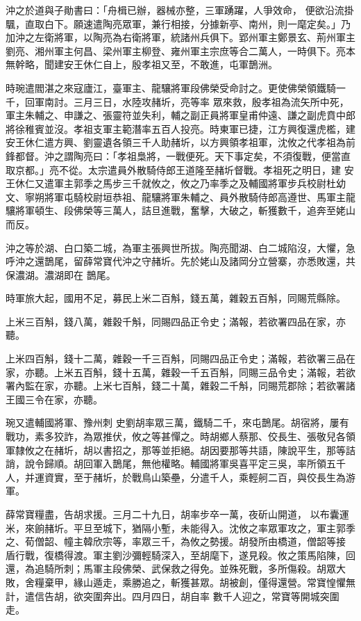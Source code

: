 \begin{pinyinscope}
 沖之於道與子勛書曰：「舟楫已辦，器械亦整，三軍踴躍，人爭效命，
 便欲沿流掛颿，直取白下。願速遣陶亮眾軍，兼行相接，分據新亭、南州，則一麾定矣。」乃加沖之左衛將軍，以陶亮為右衛將軍，統諸州兵俱下。郢州軍主鄭景玄、荊州軍主劉亮、湘州軍主何昌、梁州軍主柳登、雍州軍主宗庶等合二萬人，一時俱下。亮本無幹略，聞建安王休仁自上，殷孝祖又至，不敢進，屯軍鵲洲。



 時琬遣閻湛之來寇廬江，臺軍主、龍驤將軍段佛榮受命討之。更使佛榮領鐵騎一千，回軍南討。三月三日，水陸攻赭圻，亮等率
 眾來救，殷孝祖為流矢所中死，軍主朱輔之、申謙之、張靈符並失利，輔之副正員將軍皇甫仲遠、謙之副虎賁中郎將徐稚賓並沒。孝祖支軍主範潛率五百人投亮。時東軍已捷，江方興復還虎檻，建安王休仁遣方興、劉靈遺各領三千人助赭圻，以方興領孝祖軍，沈攸之代孝祖為前鋒都督。沖之謂陶亮曰：「孝祖梟將，一戰便死。天下事定矣，不須復戰，便當直取京都。」亮不從。太宗遣員外散騎侍郎王道隆至赭圻督戰。孝祖死之明日，建
 安王休仁又遣軍主郭季之馬步三千就攸之，攸之乃率季之及輔國將軍步兵校尉杜幼文、寧朔將軍屯騎校尉垣恭祖、龍驤將軍朱輔之、員外散騎侍郎高遵世、馬軍主龍驤將軍頓生、段佛榮等三萬人，詰旦進戰，奮擊，大破之，斬獲數千，追奔至姥山而反。



 沖之等於湖、白口築二城，為軍主張興世所拔。陶亮聞湖、白二城陷沒，大懼，急呼沖之還鵲尾，留薛常寶代沖之守赭圻。先於姥山及諸岡分立營寨，亦悉敗還，共保濃湖。濃湖即在
 鵲尾。



 時軍旅大起，國用不足，募民上米二百斛，錢五萬，雜穀五百斛，同賜荒縣除。



 上米三百斛，錢八萬，雜穀千斛，同賜四品正令史；滿報，若欲署四品在家，亦聽。



 上米四百斛，錢十二萬，雜穀一千三百斛，同賜四品正令史；滿報，若欲署三品在家，亦聽。上米五百斛，錢十五萬，雜穀一千五百斛，同賜三品令史；滿報，若欲署內監在家，亦聽。上米七百斛，錢二十萬，雜穀二千斛，同賜荒郡除；若欲署諸王國三令在家，亦聽。



 琬又遣輔國將軍、豫州刺
 史劉胡率眾三萬，鐵騎二千，來屯鵲尾。胡宿將，屢有戰功，素多狡詐，為眾推伏，攸之等甚憚之。時胡鄉人蔡那、佼長生、張敬兒各領軍隸攸之在赭圻，胡以書招之，那等並拒絕。胡因要那等共語，陳說平生，那等詰誚，說令歸順。胡回軍入鵲尾，無他權略。輔國將軍吳喜平定三吳，率所領五千人，并運資實，至于赭圻，於戰鳥山築壘，分遣千人，乘輕舸二百，與佼長生為游軍。



 薛常寶糧盡，告胡求援。三月二十九日，胡率步卒一萬，夜斫山開道，
 以布囊運米，來餉赭圻。平旦至城下，猶隔小塹，未能得入。沈攸之率眾軍攻之，軍主郭季之、荀僧韶、幢主韓欣宗等，率眾三千，為攸之勢援。胡發所由橋道，僧韶等接盾行戰，復橋得渡。軍主劉沙彌輕騎深入，至胡麾下，遂見殺。攸之策馬陷陳，回還，為追騎所刺；馬軍主段佛榮、武保救之得免。並殊死戰，多所傷殺。胡眾大敗，舍糧棄甲，緣山遁走，乘勝追之，斬獲甚眾。胡被創，僅得還營。常寶惶懼無計，遣信告胡，欲突圍奔出。四月四日，胡自率
 數千人迎之，常寶等開城突圍走。




\end{pinyinscope}
